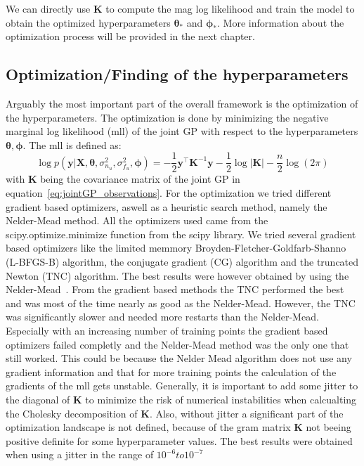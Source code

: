 \documentclass{article}
\begin{document}
We can directly use $\bm{K}$ to compute the mag log likelihood and train the
model to obtain the optimized hyperparameters $\bm{\theta_*}$ and
$\bm{\phi_*}$. More information about the optimization process will be provided
in the next chapter.

\subsection{Optimization/Finding of the hyperparameters}
Arguably the most important part of the overall framework is the optimization of the hyperparameters. The optimization is done by minimizing the negative marginal log likelihood (mll) of the joint GP with respect to the hyperparameters $\bm{\theta, \phi}$. The mll is defined as:
\begin{equation}
    \label{eq:mll}
    \log p(\bm{y}|\bm{X},\bm{\theta},\sigma_{n_u}^2,\sigma_{f_u}^2,\bm{\phi}) =
    -\frac{1}{2}\bm{y}^\intercal \bm{K}^{-1}\bm{y} - \frac{1}{2}\log\left\lvert \bm{K}\right\rvert - \frac{n}{2}\log(2\pi)
\end{equation}
with $\bm{K}$ being the covariance matrix of the joint GP in equation~\ref{eq:jointGP_observations}. For the optimization we tried different gradient based optimizers, aswell as a heuristic search method, namely the Nelder-Mead method. All the optimizers used came from the scipy.optimize.minimize function from the scipy library. We tried several gradient based optimizers like the limited memmory Broyden-Fletcher-Goldfarb-Shanno (L-BFGS-B) algorithm, the conjugate gradient (CG) algorithm and the truncated Newton (TNC) algorithm. The best results were however obtained by using the Nelder-Mead~\cite{Singer:2009NelderMead}. From the gradient based methods the TNC performed the best and was most of the time nearly as good as the Nelder-Mead. However, the TNC was significantly slower and needed more restarts than the Nelder-Mead. Especially with an increasing number of training points the gradient based optimizers failed completly and the Nelder-Mead method was the only one that still worked. This could be because the Nelder Mead algorithm does not use any gradient information and that for more training points the calculation of the gradients of the mll gets unstable. Generally, it is important to add some jitter to the diagonal of $\bm{K}$ to minimize the risk of numerical instabilities when calcualting the Cholesky decomposition of $\bm{K}$. Also, without jitter a significant part of the optimization landscape is not defined, because of the  gram matrix $\bm{K}$ not beeing positive definite for some hyperparameter values. The best results were obtained when using a jitter in the range of $10^{-6} to 10^{-7}$\\
\end{document}
